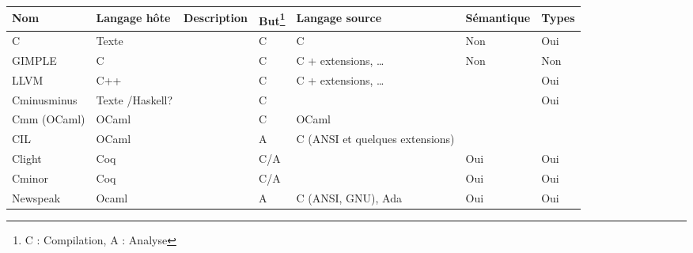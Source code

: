 \def\ilfeatfna{\footnote{C : Compilation, A : Analyse}}

\begin{tabular}{| l || l | l | l | l | l | l |}
\hline
Nom           & Langage hôte    & Description       & But\ilfeatfna & Langage source                   &  Sémantique & Types \\ \hline \hline
C             & Texte           & \cite{AnsiC}      & C             & C                                &  Non        & Oui   \\ \hline
GIMPLE        & C               & \cite{gcc-gimple} & C             & C + extensions, \ldots           &  Non        & Non   \\ \hline
LLVM          & C++             & \cite{llvm-pres}  & C             & C + extensions, \ldots           &             & Oui   \\ \hline
Cminusminus   & Texte /Haskell? & \cite{spjcmm}     & C             &                                  &             & Oui   \\ \hline
Cmm (OCaml)   & OCaml           &                   & C             & OCaml                            &             &       \\ \hline
CIL           & OCaml           & \cite{NeculaCil}  & A             & C (ANSI et quelques extensions)  &             &       \\ \hline
Clight        & Coq             & \cite{cfront}     & C/A           &                                  &  Oui        & Oui   \\ \hline
Cminor        & Coq             & \cite{cminorSL}   & C/A           &                                  &  Oui        & Oui   \\ \hline
Newspeak      & Ocaml           & \cite{newspeak}   & A             & C (ANSI, GNU), Ada               &  Oui        & Oui   \\ \hline
\end{tabular}


